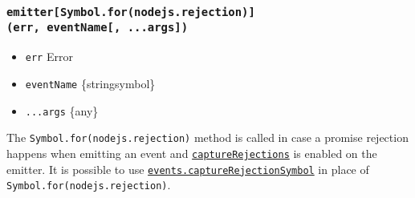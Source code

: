 \subsubsection{\texorpdfstring{\texttt{emitter{[}Symbol.for(\textquotesingle{}nodejs.rejection\textquotesingle{}){]}(err,\ eventName{[},\ ...args{]})}}{emitter{[}Symbol.for(\textquotesingle nodejs.rejection\textquotesingle){]}(err, eventName{[}, ...args{]})}}\label{emittersymbol.fornodejs.rejectionerr-eventname-...args}

\begin{itemize}
\tightlist
\item
  \texttt{err} Error
\item
  \texttt{eventName} \{string\textbar symbol\}
\item
  \texttt{...args} \{any\}
\end{itemize}

The
\texttt{Symbol.for(\textquotesingle{}nodejs.rejection\textquotesingle{})}
method is called in case a promise rejection happens when emitting an
event and
\hyperref[capture-rejections-of-promises]{\texttt{captureRejections}} is
enabled on the emitter. It is possible to use
\hyperref[eventscapturerejectionsymbol]{\texttt{events.captureRejectionSymbol}}
in place of
\texttt{Symbol.for(\textquotesingle{}nodejs.rejection\textquotesingle{})}.

\begin{Shaded}
\begin{Highlighting}[]
\NormalTok{ \{ }\OperatorTok{,} \OperatorTok{;}

 \NormalTok{ \{}
  \NormalTok{() \{}
    \NormalTok{(\{ }\OperatorTok{:} \NormalTok{ \})}\OperatorTok{;}
\NormalTok{  \}}

\OperatorTok{,} \OperatorTok{,} 
    \NormalTok{(}\OperatorTok{,} \OperatorTok{,} \OperatorTok{,}\OperatorTok{,} \OperatorTok{;}
    \OperatorTok{;}
\NormalTok{  \}}

\NormalTok{  \}}
\NormalTok{\}}
\end{Highlighting}
\end{Shaded}

